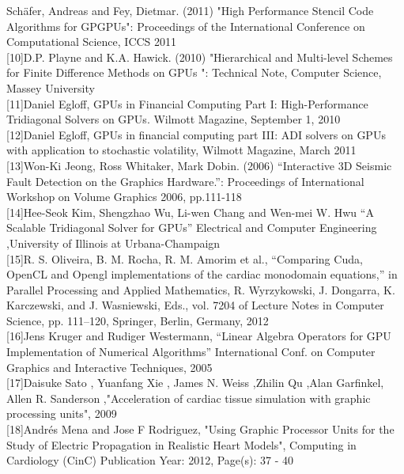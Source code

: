 \begin{singlespace}
[9]Schäfer, Andreas and Fey, Dietmar. (2011) "High Performance Stencil Code Algorithms for GPGPUs": Proceedings of the International Conference on Computational Science, ICCS 2011\\

[10]D.P. Playne and K.A. Hawick. (2010) "Hierarchical and Multi-level Schemes for Finite Difference Methods on GPUs ": Technical Note, Computer Science, Massey University\\

[11]Daniel Egloff, GPUs in Financial Computing Part I: High-Performance Tridiagonal Solvers on GPUs. Wilmott Magazine, September 1, 2010\\

[12]Daniel Egloff, GPUs in financial computing part III: ADI solvers on GPUs with application to stochastic volatility, Wilmott Magazine, March 2011\\

[13]Won-Ki Jeong, Ross Whitaker, Mark Dobin. (2006) “Interactive 3D Seismic Fault Detection on the Graphics Hardware.”: Proceedings of International Workshop on Volume Graphics 2006, pp.111-118\\

[14]Hee-Seok Kim, Shengzhao Wu, Li-wen Chang and Wen-mei W. Hwu “A Scalable Tridiagonal Solver for GPUs” Electrical and Computer Engineering ,University of Illinois at Urbana-Champaign\\ 

[15]R. S. Oliveira, B. M. Rocha, R. M. Amorim et al., “Comparing Cuda, OpenCL and Opengl implementations of the cardiac monodomain equations,” in Parallel Processing and Applied Mathematics, R. Wyrzykowski, J. Dongarra, K. Karczewski, and J. Wasniewski, Eds., vol. 7204 of Lecture Notes in Computer Science, pp. 111–120, Springer, Berlin, Germany, 2012\\

[16]Jens Kruger and Rudiger Westermann, “Linear Algebra Operators for GPU Implementation of Numerical Algorithms” International Conf. on Computer Graphics and Interactive Techniques, 2005\\

[17]Daisuke Sato , Yuanfang Xie , James N. Weiss ,Zhilin Qu ,Alan Garfinkel, Allen R. Sanderson ,"Acceleration of cardiac tissue simulation with graphic processing units", 2009\\

[18]Andrés Mena and Jose F Rodriguez, "Using Graphic Processor Units for the Study of Electric Propagation in Realistic Heart Models", Computing in Cardiology (CinC) Publication Year: 2012, Page(s): 37 - 40\\


\end{singlespace}
